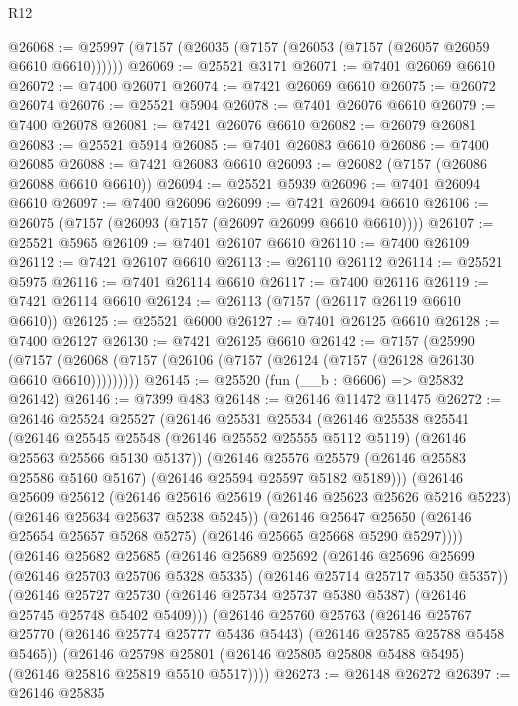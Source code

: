 \begin{lexlean}{R12}
\begin{coremodule}
@26068 := @25997 (@7157 (@26035 (@7157 (@26053 (@7157 (@26057 @26059 @6610 @6610))))))
@26069 := @25521 @3171
@26071 := @7401 @26069 @6610
@26072 := @7400 @26071
@26074 := @7421 @26069 @6610
@26075 := @26072 @26074
@26076 := @25521 @5904
@26078 := @7401 @26076 @6610
@26079 := @7400 @26078
@26081 := @7421 @26076 @6610
@26082 := @26079 @26081
@26083 := @25521 @5914
@26085 := @7401 @26083 @6610
@26086 := @7400 @26085
@26088 := @7421 @26083 @6610
@26093 := @26082 (@7157 (@26086 @26088 @6610 @6610))
@26094 := @25521 @5939
@26096 := @7401 @26094 @6610
@26097 := @7400 @26096
@26099 := @7421 @26094 @6610
@26106 := @26075 (@7157 (@26093 (@7157 (@26097 @26099 @6610 @6610))))
@26107 := @25521 @5965
@26109 := @7401 @26107 @6610
@26110 := @7400 @26109
@26112 := @7421 @26107 @6610
@26113 := @26110 @26112
@26114 := @25521 @5975
@26116 := @7401 @26114 @6610
@26117 := @7400 @26116
@26119 := @7421 @26114 @6610
@26124 := @26113 (@7157 (@26117 @26119 @6610 @6610))
@26125 := @25521 @6000
@26127 := @7401 @26125 @6610
@26128 := @7400 @26127
@26130 := @7421 @26125 @6610
@26142 := @7157
    (@25990 (@7157 (@26068 (@7157 (@26106 (@7157 (@26124 (@7157 (@26128 @26130 @6610 @6610)))))))))
@26145 := @25520 (fun (__b : @6606) => @25832 @26142)
@26146 := @7399 @483
@26148 := @26146 @11472 @11475
@26272 := @26146
    @25524
    @25527
    (@26146
      @25531
      @25534
      (@26146
        @25538
        @25541
        (@26146 @25545 @25548 (@26146 @25552 @25555 @5112 @5119) (@26146 @25563 @25566 @5130 @5137))
        (@26146
          @25576
          @25579
          (@26146 @25583 @25586 @5160 @5167)
          (@26146 @25594 @25597 @5182 @5189)))
      (@26146
        @25609
        @25612
        (@26146 @25616 @25619 (@26146 @25623 @25626 @5216 @5223) (@26146 @25634 @25637 @5238 @5245))
        (@26146
          @25647
          @25650
          (@26146 @25654 @25657 @5268 @5275)
          (@26146 @25665 @25668 @5290 @5297))))
    (@26146
      @25682
      @25685
      (@26146
        @25689
        @25692
        (@26146 @25696 @25699 (@26146 @25703 @25706 @5328 @5335) (@26146 @25714 @25717 @5350 @5357))
        (@26146
          @25727
          @25730
          (@26146 @25734 @25737 @5380 @5387)
          (@26146 @25745 @25748 @5402 @5409)))
      (@26146
        @25760
        @25763
        (@26146 @25767 @25770 (@26146 @25774 @25777 @5436 @5443) (@26146 @25785 @25788 @5458 @5465))
        (@26146
          @25798
          @25801
          (@26146 @25805 @25808 @5488 @5495)
          (@26146 @25816 @25819 @5510 @5517))))
@26273 := @26148 @26272
@26397 := @26146
    @25835

\end{coremodule}
\end{lexlean}
